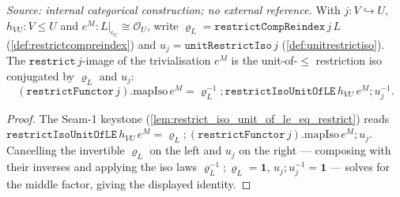 \begin{lemma}

  \label{lem:trivialisation_em_leg}
  \textit{Source: internal categorical construction; no external reference.}
  With \(j : V \hookrightarrow U\), \(h_{VU} : V \le U\) and \(e^M : L|_{\iota_U} \cong \mathcal O_U\),
  write \(\varrho_L = \mathtt{restrictCompReindex}\,j\,L\) (\cref{def:restrictcompreindex}) and
  \(u_j = \mathtt{unitRestrictIso}\,j\) (\cref{def:unitrestrictiso}). The \(\mathtt{restrict}\,j\)-image of
  the trivialisation \(e^M\) is the unit-of-\(\le\) restriction iso conjugated by \(\varrho_L\) and
  \(u_j\):
  \[
    (\mathtt{restrictFunctor}\,j).\mathrm{mapIso}\,e^M
      = \varrho_L^{-1} \mathbin{;} \mathtt{restrictIsoUnitOfLE}\,h_{VU}\,e^M \mathbin{;} u_j^{-1}.
  \]
\end{lemma}
\begin{proof}
  \leanok
  The Seam-1 keystone (\cref{lem:restrict_iso_unit_of_le_eq_restrict}) reads
  \(\mathtt{restrictIsoUnitOfLE}\,h_{VU}\,e^M
    = \varrho_L \mathbin{;} (\mathtt{restrictFunctor}\,j).\mathrm{mapIso}\,e^M \mathbin{;} u_j\).
  Cancelling the invertible \(\varrho_L\) on the left and \(u_j\) on the right --- composing with their
  inverses and applying the iso laws \(\varrho_L^{-1} \mathbin{;} \varrho_L = \mathbf 1\),
  \(u_j \mathbin{;} u_j^{-1} = \mathbf 1\) --- solves for the middle factor, giving the displayed identity.
\end{proof}

